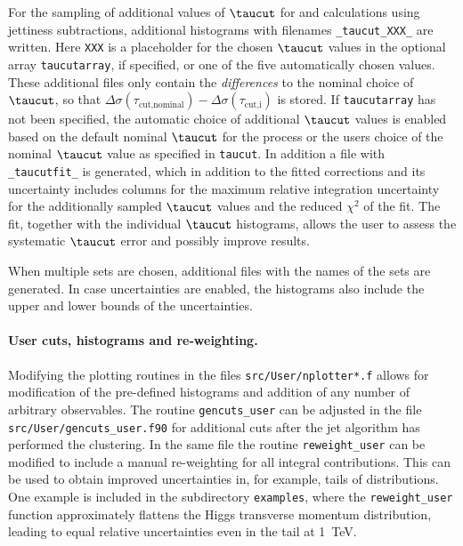 For the sampling of additional values of $\taucut$ for \NLO{} and \NNLO{} calculations using jettiness subtractions, 
additional histograms with filenames \texttt{\_taucut\_XXX\_} are written. Here \texttt{XXX} is a placeholder for the 
chosen $\taucut$ values in the optional array \texttt{taucutarray}, if specified, or one of the five automatically 
chosen values. These additional files 
only contain the \emph{differences} to the nominal choice of 
$\taucut$, so that $\Delta\sigma(\tau_\text{cut,nominal}) - \Delta\sigma(\tau_\text{cut,i})$ is stored. If 
\texttt{taucutarray} has not 
been specified, the automatic choice of additional
$\taucut$ values is enabled based on the default nominal $\taucut$ for the process or the users choice of the nominal 
$\taucut$ value as specified in \texttt{taucut}.
In addition a file with \texttt{\_taucutfit\_} is generated, which in addition to the fitted corrections and its 
uncertainty includes columns for the maximum relative integration uncertainty for the additionally sampled $\taucut$ 
values and the 
reduced $\chi^2$ of the fit. %
The fit, together with the individual $\taucut$ 
histograms, allows the user to assess the systematic $\taucut$ error and possibly improve results.

When multiple \PDF{} sets are chosen, additional files with the names of the \PDF{} sets are generated. In case
\PDF{} uncertainties are enabled, the histograms also include the upper and lower bounds of the \PDF{} uncertainties.

\paragraph{User cuts, histograms and re-weighting.}

Modifying the plotting routines in the files \texttt{src/User/nplotter*.f} allows for modification of the pre-defined 
histograms and addition of any number of arbitrary observables. The routine \texttt{gencuts\_user} can be adjusted  in 
the file
\texttt{src/User/gencuts\_user.f90} for additional cuts after the jet algorithm has performed the 
clustering. In the same file the routine \texttt{reweight\_user} can be modified to include a manual re-weighting
for all integral contributions. This can be used to obtain improved uncertainties in, for example, tails of 
distributions.
One example is included in the subdirectory \texttt{examples}, where the \texttt{reweight\_user} function approximately
flattens the Higgs transverse momentum distribution, leading to equal relative uncertainties even in the tail at 
\SI{1}{TeV}.


